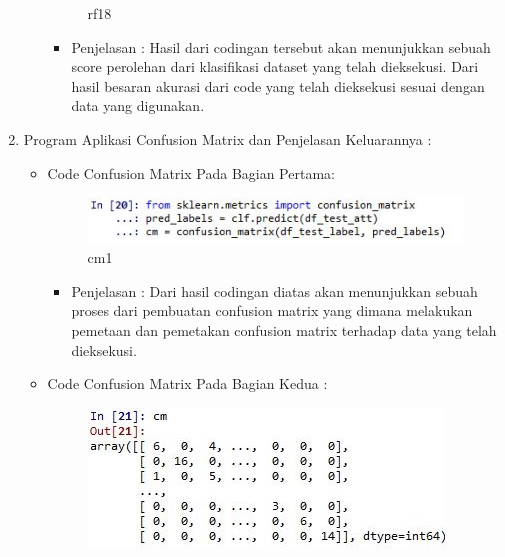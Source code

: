 \begin{enumerate}
\begin{itemize}
\begin{figure}[ht]
\caption{rf18}
\label{contoh}
\end{figure}
\par
\begin{itemize}
\item Penjelasan : Hasil dari codingan tersebut akan menunjukkan sebuah score perolehan dari klasifikasi dataset yang telah dieksekusi. Dari hasil besaran akurasi dari code yang telah dieksekusi sesuai dengan data yang digunakan.
\par
\par
\end{itemize}
\end{itemize}

\par
\par
\item Program Aplikasi Confusion Matrix dan Penjelasan Keluarannya :
\begin{itemize}
\item Code Confusion Matrix Pada Bagian Pertama:
\par
\begin{figure}[ht]
\centering
\includegraphics[scale=0.4]{figures/cm1cahya.jpg}
\caption{cm1}
\label{contoh}
\end{figure}
\par
\begin{itemize}
\item Penjelasan : Dari hasil codingan diatas akan menunjukkan sebuah proses dari pembuatan confusion matrix yang dimana melakukan pemetaan dan pemetakan confusion matrix terhadap data yang telah dieksekusi.
\par 
\par
\end{itemize}
\item Code Confusion Matrix Pada Bagian Kedua :
\par
\begin{figure}[ht]
\centering
\includegraphics[scale=0.2]{figures/cm2cahya.jpg}

\end{figure}
\end{itemize}
\end{enumerate}
